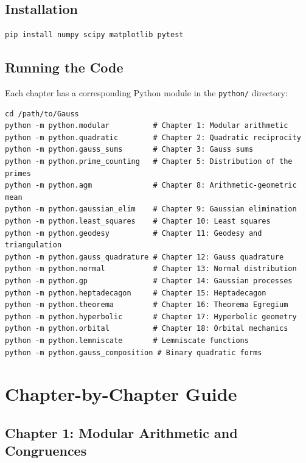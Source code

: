 \documentclass[11pt,a4paper]{article}
\begin{document}
\subsection{Installation}

\begin{lstlisting}[style=bash, caption={Installing dependencies}]
pip install numpy scipy matplotlib pytest
\end{lstlisting}

\subsection{Running the Code}

Each chapter has a corresponding Python module in the \texttt{python/} directory:

\begin{lstlisting}[style=bash, caption={Running a module}]
cd /path/to/Gauss
python -m python.modular          # Chapter 1: Modular arithmetic
python -m python.quadratic        # Chapter 2: Quadratic reciprocity
python -m python.gauss_sums       # Chapter 3: Gauss sums
python -m python.prime_counting   # Chapter 5: Distribution of the primes
python -m python.agm              # Chapter 8: Arithmetic-geometric mean
python -m python.gaussian_elim    # Chapter 9: Gaussian elimination
python -m python.least_squares    # Chapter 10: Least squares
python -m python.geodesy          # Chapter 11: Geodesy and triangulation
python -m python.gauss_quadrature # Chapter 12: Gauss quadrature
python -m python.normal           # Chapter 13: Normal distribution
python -m python.gp               # Chapter 14: Gaussian processes
python -m python.heptadecagon     # Chapter 15: Heptadecagon
python -m python.theorema         # Chapter 16: Theorema Egregium
python -m python.hyperbolic       # Chapter 17: Hyperbolic geometry
python -m python.orbital          # Chapter 18: Orbital mechanics
python -m python.lemniscate       # Lemniscate functions
python -m python.gauss_composition # Binary quadratic forms
\end{lstlisting}

\section{Chapter-by-Chapter Guide}

\subsection{Chapter 1: Modular Arithmetic and Congruences}
\end{document}

